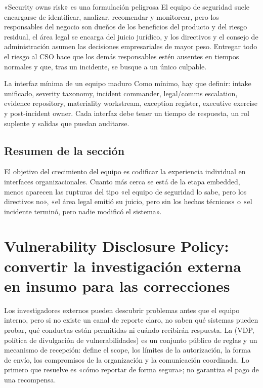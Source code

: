 \documentclass[a4paper]{article}
\begin{document}
\begin{warningbox}{«Security owns risk» es una formulación peligrosa}
El equipo de seguridad suele encargarse de identificar, analizar, recomendar y monitorear, pero los responsables del negocio son dueños de los beneficios del producto y del riesgo residual, el área legal se encarga del juicio jurídico, y los directivos y el consejo de administración asumen las decisiones empresariales de mayor peso. Entregar todo el riesgo al CSO hace que los demás responsables estén ausentes en tiempos normales y que, tras un incidente, se busque a un único culpable.
\end{warningbox}

\begin{importantbox}{La interfaz mínima de un equipo maduro}
Como mínimo, hay que definir: intake unificado, severity taxonomy, incident commander, legal/comms escalation, evidence repository, materiality workstream, exception register, executive exercise y post-incident owner. Cada interfaz debe tener un tiempo de respuesta, un rol suplente y salidas que puedan auditarse.
\end{importantbox}

\subsection{Resumen de la sección}

El objetivo del crecimiento del equipo es codificar la experiencia individual en interfaces organizacionales. Cuanto más cerca se está de la etapa embedded, menos aparecen las rupturas del tipo «el equipo de seguridad lo sabe, pero los directivos no», «el área legal emitió su juicio, pero sin los hechos técnicos» o «el incidente terminó, pero nadie modificó el sistema».
\section{Vulnerability Disclosure Policy: convertir la investigación externa en insumo para las correcciones}

Los investigadores externos pueden descubrir problemas antes que el equipo interno, pero si no existe un canal de reporte claro, no saben qué sistemas pueden probar, qué conductas están permitidas ni cuándo recibirán respuesta. La  (VDP, política de divulgación de vulnerabilidades) es un conjunto público de reglas y un mecanismo de recepción: define el scope, los límites de la autorización, la forma de envío, los compromisos de la organización y la comunicación coordinada. Lo primero que resuelve es «cómo reportar de forma segura»; no garantiza el pago de una recompensa.
\end{document}
